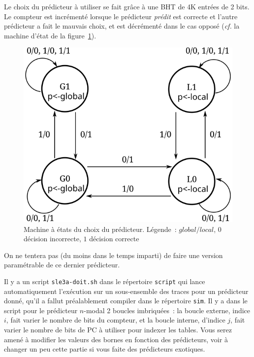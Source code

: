 \documentclass[a4paper]{article}
\begin{document}
\begin{enumerate}
      Le choix du prédicteur à utiliser se fait grâce à une BHT de 4K entrées de 2 bits.
      Le compteur est incrémenté lorsque le prédicteur \emph{prédit} est correcte et l'autre prédicteur a fait le mauvais choix, et est décrémenté dans le cas opposé (\emph{cf.} la machine d'état de la figure~\ref{mixte-graphe}).
      \begin{figure}[hbt]\center\leavevmode
      \includegraphics[scale=0.7]{mixte-graphe}
      \caption{Machine à états du choix du prédicteur.
      Légende~: $global/local$, $0$ décision incorrecte, $1$ décision correcte}
      \label{mixte-graphe}
      \end{figure}

      On ne tentera pas (du moins dans le temps imparti) de faire une version paramétrable de ce dernier prédicteur.
\end{enumerate}

Il y a un script \verb+sle3a-doit.sh+ dans le répertoire \verb+script+ qui lance automatiquement l'exécution sur un sous-ensemble des traces pour un prédicteur donné, qu'il a fallut préalablement compiler dans le répertoire \verb+sim+.
Il y a dans le script pour le prédicteur $n$-modal 2 boucles imbriquées~: la boucle externe, indice $i$, fait varier le nombre de bits du compteur, et la boucle interne, d'indice $j$, fait varier le nombre de bits de PC à utiliser pour indexer les tables.
Vous serez amené à modifier les valeurs des bornes en fonction des prédicteurs, voir à changer un peu cette partie si vous faite des prédicteurs exotiques.
\end{document}
